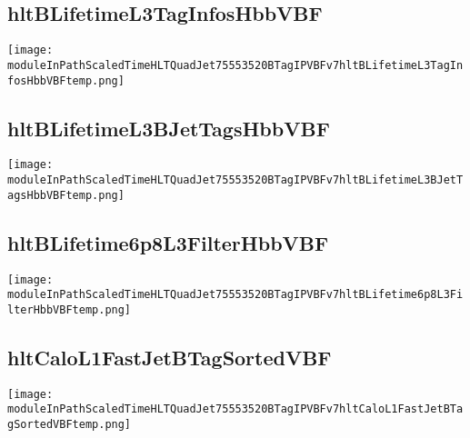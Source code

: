 \documentclass[10pt,a5paper,landscape]{report}
\begin{document}
\subsection{hltBLifetimeL3TagInfosHbbVBF} \centering \texttt{[image: moduleInPathScaledTimeHLTQuadJet75553520BTagIPVBFv7hltBLifetimeL3TagInfosHbbVBFtemp.png]}
\subsection{hltBLifetimeL3BJetTagsHbbVBF} \centering \texttt{[image: moduleInPathScaledTimeHLTQuadJet75553520BTagIPVBFv7hltBLifetimeL3BJetTagsHbbVBFtemp.png]}
\subsection{hltBLifetime6p8L3FilterHbbVBF} \centering \texttt{[image: moduleInPathScaledTimeHLTQuadJet75553520BTagIPVBFv7hltBLifetime6p8L3FilterHbbVBFtemp.png]}
\subsection{hltCaloL1FastJetBTagSortedVBF} \centering \texttt{[image: moduleInPathScaledTimeHLTQuadJet75553520BTagIPVBFv7hltCaloL1FastJetBTagSortedVBFtemp.png]}
\end{document}
